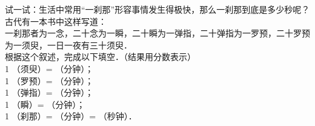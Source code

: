 
试一试：生活中常用“一刹那”形容事情发生得极快，那么一刹那到底是多少秒呢？古代有一本书中这样写道：\\
一刹那者为一念，二十念为一瞬，二十瞬为一弹指，二十弹指为一罗预，二十罗预为一须臾，一日一夜有三十须臾．\\
根据这个叙述，完成以下填空．（结果用分数表示）\\
1 （须臾）= \key{\hspace{4em}}（分钟）；\\
1 （罗预）= \key{\hspace{4em}}（分钟）；\\
1 （弹指）= \key{\hspace{4em}}（分钟）；\\
1 （瞬）= \key{\hspace{4em}}（分钟）；\\
1 （刹那）= \key{\hspace{4em}}（分钟）= \key{\hspace{4em}}（秒钟）．\\

